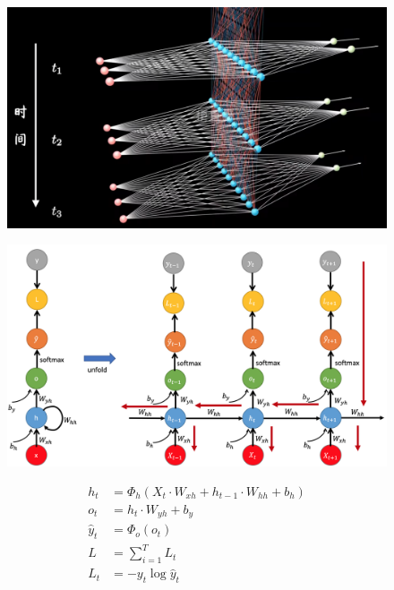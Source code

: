 \documentclass{beamer}
\begin{document}
\begin{frame}
    \begin{figure}[l]
        \centering
        \includegraphics[height=.75\textheight]{pic/rnn.png}
    \end{figure}
\end{frame}

\begin{frame}
    \begin{figure}[l]
        \centering
        \includegraphics[height=.75\textheight]{pic/bptt.png}
    \end{figure}
\end{frame}


\begin{frame}
    \begin{equation*}
        \begin{aligned}
            h_t &= \Phi_h(X_t\cdot W_{xh}+h_{t−1}\cdot W_{hh}+b_h) \\
            o_t &= h_t\cdot W_{yh}+b_y \\
            \hat{y}_t &= \Phi_o(o_t) \\
            L &= \sum_{i=1}^T L_t \\
            L_t &= -y_t\log\hat{y}_t
        \end{aligned}
    \end{equation*}
\end{frame}
\end{document}
